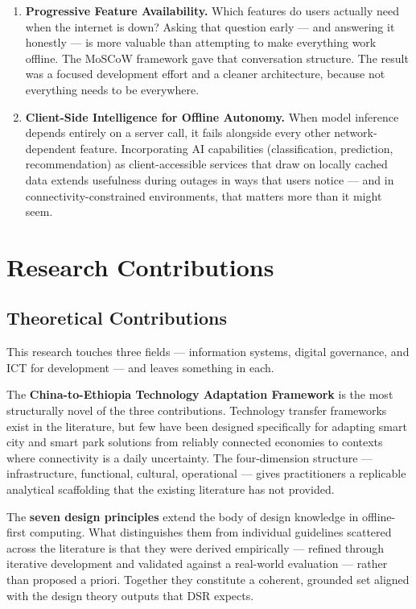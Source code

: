 \begin{enumerate}
\item \textbf{Progressive Feature Availability.} Which features do users actually need when the internet is down? Asking that question early --- and answering it honestly --- is more valuable than attempting to make everything work offline. The MoSCoW framework gave that conversation structure. The result was a focused development effort and a cleaner architecture, because not everything needs to be everywhere.

\item \textbf{Client-Side Intelligence for Offline Autonomy.} When model inference depends entirely on a server call, it fails alongside every other network-dependent feature. Incorporating AI capabilities (classification, prediction, recommendation) as client-accessible services that draw on locally cached data extends usefulness during outages in ways that users notice --- and in connectivity-constrained environments, that matters more than it might seem.
\end{enumerate}

\section{Research Contributions}

\subsection{Theoretical Contributions}

This research touches three fields --- information systems, digital governance, and ICT for development --- and leaves something in each.

The \textbf{China-to-Ethiopia Technology Adaptation Framework} is the most structurally novel of the three contributions. Technology transfer frameworks exist in the literature, but few have been designed specifically for adapting smart city and smart park solutions from reliably connected economies to contexts where connectivity is a daily uncertainty. The four-dimension structure --- infrastructure, functional, cultural, operational --- gives practitioners a replicable analytical scaffolding that the existing literature has not provided.

The \textbf{seven design principles} extend the body of design knowledge in offline-first computing. What distinguishes them from individual guidelines scattered across the literature is that they were derived empirically --- refined through iterative development and validated against a real-world evaluation --- rather than proposed a priori. Together they constitute a coherent, grounded set aligned with the design theory outputs that DSR expects.

